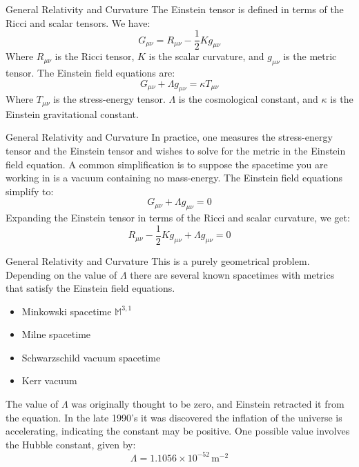 \documentclass{beamer}
\begin{document}
    \begin{frame}{General Relativity and Curvature}
        The Einstein tensor is defined in terms of the Ricci and scalar tensors.
        We have:
        \begin{equation}
            G_{\mu\nu}=R_{\mu\nu}-\frac{1}{2}Kg_{\mu\nu}
        \end{equation}
        Where $R_{\mu\nu}$ is the Ricci tensor, $K$ is the scalar curvature,
        and $g_{\mu\nu}$ is the metric tensor. The Einstein field equations are:
        \begin{equation}
            G_{\mu\nu}+\Lambda{g}_{\mu\nu}=\kappa{T}_{\mu\nu}
        \end{equation}
        Where $T_{\mu\nu}$ is the stress-energy tensor. $\Lambda$ is the
        cosmological constant, and $\kappa$ is the Einstein gravitational
        constant.
    \end{frame}
    \begin{frame}{General Relativity and Curvature}
        In practice, one measures the stress-energy tensor and the Einstein
        tensor and wishes to solve for the metric in the Einstein field
        equation. A common simplification is to suppose the spacetime you are
        working in is a vacuum containing no mass-energy. The Einstein field
        equations simplify to:
        \begin{equation}
            G_{\mu\nu}+\Lambda{g}_{\mu\nu}=0
        \end{equation}
        Expanding the Einstein tensor in terms of the Ricci and scalar
        curvature, we get:
        \begin{equation}
            R_{\mu\nu}-\frac{1}{2}Kg_{\mu\nu}+\Lambda{g}_{\mu\nu}=0
        \end{equation}
    \end{frame}
    \begin{frame}{General Relativity and Curvature}
        This is a purely geometrical problem. Depending on the value of
        $\Lambda$ there are several known spacetimes with metrics that satisfy
        the Einstein field equations.
        \begin{itemize}
            \item Minkowski spacetime $\mathbb{M}^{3,1}$
            \item Milne spacetime
            \item Schwarzschild vacuum spacetime
            \item Kerr vacuum
        \end{itemize}
        The value of $\Lambda$ was originally thought to be zero, and Einstein
        retracted it from the equation. In the late 1990's it was discovered
        the inflation of the universe is accelerating, indicating the constant
        may be positive. One possible value involves the Hubble constant, given
        by:
        \begin{equation}
            \Lambda=1.1056\times{10}^{-52}\,\textrm{m}^{-2}
        \end{equation}
    \end{frame}
\end{document}
